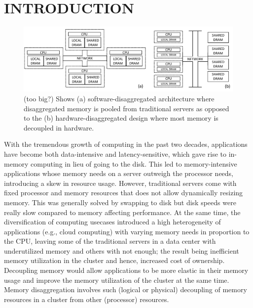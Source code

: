 \section{INTRODUCTION}
\label{sec:intro}

\begin{figure}[h!]
    \centering
    \includegraphics[width=.9\linewidth]{fig/architecture.pdf}
    \caption{(too big?) Shows (a) software-disaggregated 
    architecture where disaggregated memory is pooled from 
    traditional servers as opposed to the (b) hardware-disaggregated
    design where most memory is decoupled in hardware.}
    \label{fig:architecture}
\end{figure}

With the tremendous growth of computing in the past two 
decades, applications have become both data-intensive 
and latency-sensitive, which gave rise to in-memory 
computing in lieu of going to the disk. 
This led to memory-intensive 
applications whose memory needs on a server outweigh the 
processor needs, introducing a skew in resource usage.
However, traditional servers come with fixed processor 
and memory resources that does not allow dynamically
resizing memory. This was generally solved by swapping 
to disk but disk speeds were really slow compared to memory 
affecting performance. 
At the same time, the diversification of computing usecases 
introduced a high heterogeneity of applications (e.g., cloud 
computing) with varying memory needs in proportion to 
the CPU, leaving some of the traditional servers in a data center  
with underutilized memory and others with not enough; the result
being inefficient memory utilization in the cluster and hence,
increased cost of ownership. Decoupling memory would allow 
applications to be more elastic in their memory usage and 
improve the memory utilization of the cluster at the same time.
Memory disaggregation involves such (logical or physical) 
decoupling of memory resources in a cluster from other 
(processor) resources. 

